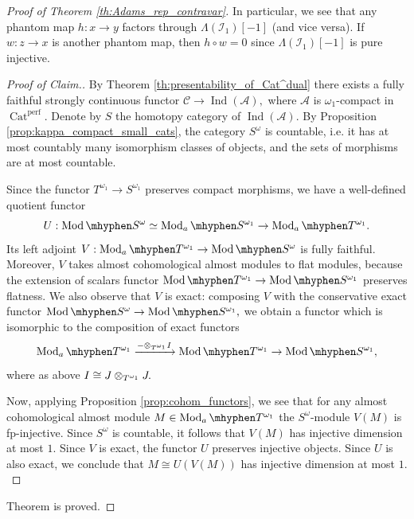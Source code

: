\documentclass[11pt,leqno]{amsart}
\numberwithin{equation}{section}
\newcommand{\tens}[1]{%
  \mathbin{\mathop{\otimes}\displaylimits_{#1}}%
}
\newcommand{\hy}{\mhyphen}
\newcommand{\xto}{\xrightarrow}
\newcommand{\Cat}{\operatorname{Cat}}
\newcommand{\cA}{{\mathcal A}}
\newcommand{\cI}{{\mathcal I}}
\newcommand{\cC}{{\mathcal C}}
\newcommand{\perf}{\operatorname{perf}}
\newcommand{\Ind}{\operatorname{Ind}}
\newcommand{\Mod}{\operatorname{Mod}}
\begin{document}
\begin{proof}[Proof of Theorem \ref{th:Adams_rep_contravar}]
In particular, we see that any phantom map $h:x\to y$ factors through $\Lambda(\cI_1)[-1]$ (and vice versa). If $w:z\to x$ is another phantom map, then $h\circ w=0$ since $\Lambda(\cI_1)[-1]$ is pure injective.
\begin{proof}[Proof of Claim.]
By Theorem \ref{th:presentability_of_Cat^dual} there exists a fully faithful strongly continuous functor $\cC\to\Ind(\cA),$ where $\cA$ is $\omega_1$-compact in $\Cat^{\perf}.$ Denote by $S$ the homotopy category of $\Ind(\cA).$ By Proposition \ref{prop:kappa_compact_small_cats}, the category $S^{\omega}$ is countable, i.e. it has at most countably many isomorphism classes of objects, and the sets of morphisms are at most countable.

Since the functor $T^{\omega_1}\to S^{\omega_1}$ preserves compact morphisms, we have a well-defined quotient functor $$U:\Mod\hy S^{\omega}\simeq\Mod_a\hy S^{\omega_1}\to\Mod_a\hy T^{\omega_1}.$$ Its left adjoint $V:\Mod_a\hy T^{\omega_1}\to \Mod\hy S^{\omega}$ is fully faithful. Moreover, $V$ takes almost cohomological almost modules to flat modules, because the extension of scalars functor $\Mod\hy T^{\omega_1}\to\Mod\hy S^{\omega_1}$ preserves flatness. We also observe that $V$ is exact: composing $V$ with the conservative exact functor $\Mod\hy S^{\omega}\to\Mod\hy S^{\omega_1},$ we obtain a functor which is isomorphic to the composition of exact functors
$$\Mod_a\hy T^{\omega_1}\xto{-\tens{T^{\omega_1}}I}\Mod\hy T^{\omega_1}\to\Mod\hy S^{\omega_1},$$
where as above $I\cong J\tens{T^{\omega_1}}J.$

Now, applying Proposition \ref{prop:cohom_functors}, we see that for any almost cohomological almost module $M\in\Mod_a\hy T^{\omega_1}$ the $S^{\omega}$-module $V(M)$ is fp-injective. Since $S^{\omega}$ is countable, it follows that $V(M)$ has injective dimension at most $1.$ Since $V$ is exact, the functor $U$ preserves injective objects. Since $U$ is also exact, we conclude that $M\cong U(V(M))$ has injective dimension at most $1.$
\end{proof}
Theorem is proved.
\end{proof}
\end{document}
